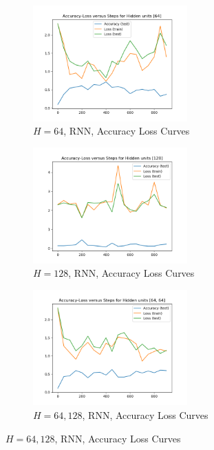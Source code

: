 \begin{figure}[!htbp]
\begin{subfigure}
\centering
\includegraphics[angle=0,width=0.65\textwidth]{assign-3/logs/Q1-MNIST-RNN-[64].png}
\caption{$H=64$, RNN, Accuracy Loss Curves}
\end{subfigure}
\begin{subfigure}
\centering
\includegraphics[angle=0,width=0.65\textwidth]{assign-3/logs/Q1-MNIST-RNN-[128].png}
\caption{$H=128$, RNN, Accuracy Loss Curves}
\end{subfigure}
\begin{subfigure}
\centering
\includegraphics[angle=0,width=0.65\textwidth]{assign-3/logs/Q1-MNIST-RNN-[64, 64].png}
\caption{$H=64, 128$, RNN, Accuracy Loss Curves}
\end{subfigure}
\end{figure}
